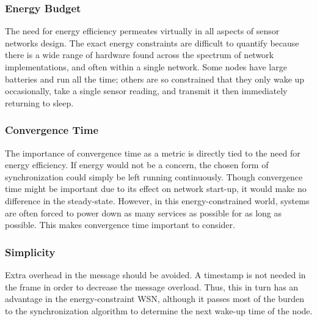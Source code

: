 \documentclass[a4paper,10pt]{report}
\begin{document}
\subsubsection{\textbf{Energy Budget}} The need for energy efficiency
permeates virtually in all aspects of sensor networks design. The
exact energy constraints are difficult to quantify because there is
a wide range of hardware found across the spectrum of network
implementations, and often within a single network. Some nodes have
large batteries and run all the time; others are so constrained that
they only wake up occasionally, take a single sensor reading, and
transmit it then immediately returning to sleep.
\subsubsection{\textbf{Convergence Time}} The importance of convergence time
as a metric is directly tied to the need for energy efficiency. If
energy would not be a concern, the chosen form of synchronization
could simply be left running continuously. Though convergence time
might be important due to its effect on network start-up, it would
make no difference in the steady-state. However, in this
energy-constrained world, systems are often forced to power down as
many services as possible for as long as possible. This makes
convergence time important to consider.
\subsubsection{\textbf{Simplicity}} Extra overhead in the message should be avoided. A
timestamp is not needed in the frame in order to decrease the
message overload. Thus, this in turn has an advantage in the
energy-constraint WSN, although it passes most of the burden to the
synchronization algorithm to determine the next wake-up time of the
node.
\end{document}
